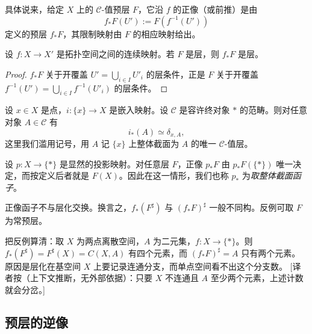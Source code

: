 具体说来，给定 $X$ 上的 $\mathcal C$-值预层 $F$，它沿 $f$ 的正像（或前推）是由
\[
f_*F(U'):=F(f^{-1}(U'))
\]
定义的预层 $f_*F$，其限制映射由 $F$ 的相应映射给出。

\begin{proposition}\label{prop:3.2.2}
设 $f\colon X\to X'$ 是拓扑空间之间的连续映射。若 $F$ 是层，则 $f_*F$ 是层。
\end{proposition}

\begin{proof}
$f_*F$ 关于开覆盖 $U'=\bigcup_{i\in I}U'_i$ 的层条件，正是 $F$ 关于开覆盖 $f^{-1}(U')=\bigcup_{i\in I}f^{-1}(U'_i)$ 的层条件。
\end{proof}

\begin{example}\label{ex:3.2.3}
设 $x\in X$ 是点，$i\colon\{x\}\to X$ 是嵌入映射。设 $\mathcal C$ 是容许终对象 $*$ 的范畴。则对任意对象 $A\in\mathcal C$ 有
\[
i_*(A)\simeq\delta_{x,A},
\]
这里我们滥用记号，用 $A$ 记 $\{x\}$ 上整体截面为 $A$ 的唯一 $\mathcal C$-值层。
\end{example}

\begin{example}\label{ex:3.2.4}
设 $p\colon X\to\{*\}$ 是显然的投影映射。对任意层 $F$，正像 $p_*F$ 由 $p_*F(\{*\})$ 唯一决定，而按定义后者就是 $F(X)$。因此在这一情形，我们也称 $p_*$ 为\emph{取整体截面函子}。
\end{example}

\begin{warning}\label{warn:3.2.5}
正像函子不与层化交换。换言之，$f_*(F^{\sharp})$ 与 $(f_*F)^{\sharp}$ 一般不同构。反例可取 $F$ 为常预层。
\end{warning}

\begin{yizhu}
把反例算清：取 $X$ 为两点离散空间，$A$ 为二元集，$f\colon X\to\{*\}$。则 $f_*(F^{\sharp})=F^{\sharp}(X)=C(X,A)$ 有四个元素，而 $(f_*F)^{\sharp}=A$ 只有两个元素。原因是层化在基空间 $X$ 上要记录连通分支，而单点空间看不出这个分支数。
[译者按（上下文推断，无外部依据）：只要 $X$ 不连通且 $A$ 至少两个元素，上述计数就会分岔。]
\end{yizhu}

\subsection{预层的逆像}\label{sec:3.3}

